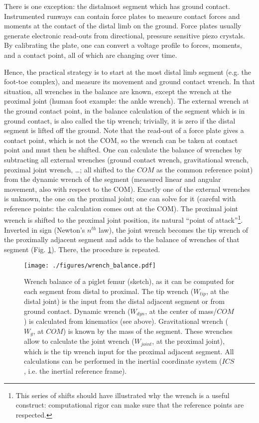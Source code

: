 There is one exception: the distalmost segment which has ground contact.
Instrumented runways can contain force plates to measure contact forces and moments at the contact of the distal limb on the ground.
Force plates usually generate electronic read-outs from directional, pressure sensitive piezo crystals.
By calibrating the plate, one can convert a voltage profile to forces, moments, and a contact point, all of which are changing over time.


Hence, the practical strategy \citep{Robertson2013,Lynch2017,Dumas2004} is to start at the most distal limb segment (e.g. the foot-toe complex), and measure its movement and ground contact wrench.
In that situation, all wrenches in the balance are known, except the wrench at the proximal joint (human foot example: the ankle wrench).
The external wrench at the ground contact point, in the balance calculation of the segment which is in ground contact, is also called the tip wrench; trivially, it is zero if the distal segment is lifted off the ground.
Note that the read-out of a force plate gives a contact point, which is not the COM, so the wrench can be taken at contact point and must then be shifted.
One can calculate the balance of wrenches by subtracting all external wrenches (ground contact wrench, gravitational wrench, proximal joint wrench, \ldots{}; all shifted to the \(COM\) as the common reference point) from the dynamic wrench of the segment (measured linear and angular movement, also with respect to the COM).
Exactly one of the external wrenches is unknown, the one on the proximal joint; one can solve for it (careful with reference points: the calculation comes out at the COM).
The proximal joint wrench is shifted to the proximal joint position, its natural ``point of attack''\footnote{This series of shifts should have illustrated why the wrench is a useful construct: computational rigor can make sure that the reference points are respected.}.
Inverted in sign (Newton's \(n^{th}\) law), the joint wrench becomes the tip wrench of the proximally adjacent segment and adds to the balance of wrenches of that segment (Fig. \ref{fig:wrenchbalance}).
There, the procedure is repeated.

\begin{figure}[p]
\centering
\texttt{[image: ./figures/wrench\_balance.pdf]}
\caption{\label{fig:wrenchbalance}Wrench balance of a piglet femur (sketch), as it can be computed for each segment from distal to proximal. The tip wrench (\(W_{tip}\), at the distal joint) is the input from the distal adjacent segment or from ground contact. Dynamic wrench (\(W_{dyn}\), at the center of mass/\(COM\)) is calculated from kinematics (see above). Gravitational wrench (\(W_{g}\), at \(COM\)) is known by the mass of the segment. These wrenches allow to calculate the joint wrench (\(W_{joint}\), at the proximal joint), which is the tip wrench input for the proximal adjacent segment. All calculations can be performed in the inertial coordinate system (\(ICS\), i.e. the inertial reference frame).}
\end{figure}


